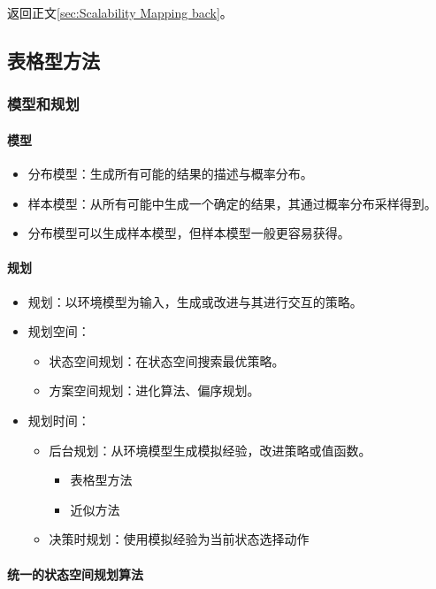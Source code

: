\documentclass[
12pt, %
a4paper, 
oneside, %
headinclude,footinclude, %
]{scrartcl}
\begin{document}
返回正文\ref{sec:Scalability Mapping back}。
\subsection[表格型方法]{表格型方法}\label{sec:table}
\subsubsection[模型和规划]{模型和规划}
\paragraph{模型}
\begin{itemize}
\item 分布模型：生成所有可能的结果的描述与概率分布。
\item 样本模型：从所有可能中生成一个确定的结果，其通过概率分布采样得到。
\item 分布模型可以生成样本模型，但样本模型一般更容易获得。
\end{itemize}
\paragraph{规划}
\begin{itemize}
\item 规划：以环境模型为输入，生成或改进与其进行交互的策略。
\item 规划空间：
\begin{itemize}
\item 状态空间规划：在状态空间搜索最优策略。
\item 方案空间规划：进化算法、偏序规划。
\end{itemize}
\item 规划时间：
\begin{itemize}
\item 后台规划：从环境模型生成模拟经验，改进策略或值函数。
\begin{itemize}
\item 表格型方法
\item 近似方法
\end{itemize}
\item 决策时规划：使用模拟经验为当前状态选择动作
\end{itemize}
\end{itemize}
\paragraph{统一的状态空间规划算法}~\\
\end{document}
